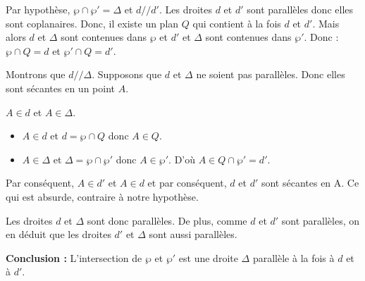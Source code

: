 \documentclass{cornouaille}
\begin{document}
\begin{preuve}
  Par hypothèse, $\wp\cap\wp'=\Delta$ et $d//d'$. Les droites $d$ et
  $d'$ sont parallèles donc elles sont coplanaires. Donc, il existe un
  plan $Q$ qui contient à la fois $d$ et $d'$. Mais alors $d$ et
  $\Delta$ sont contenues dans $\wp$ et $d'$ et $\Delta$ sont
  contenues dans $\wp'$. Donc : $\wp\cap Q=d$ et $\wp'\cap Q=d'$.

  Montrons que $d//\Delta$.
  Supposons que $d$ et $\Delta$ ne soient pas parallèles. Donc elles
  sont sécantes en un point $A$.

  $A\in d$ et $A\in\Delta$.
  \begin{itemize}
  \item $A\in d$ et $d=\wp\cap Q$ donc $A\in Q$.
  \item $A\in\Delta$ et $\Delta=\wp\cap\wp'$ donc $A\in\wp'$.  D'où
    $A\in Q\cap\wp'=d'$.
  \end{itemize}

  Par conséquent, $A\in d'$ et $A\in d$ et par conséquent, $d$ et $d'$
  sont sécantes en A.
  Ce qui est absurde, contraire à notre hypothèse.

  Les droites $d$ et $\Delta$ sont donc parallèles.  De plus, comme
  $d$ et $d'$ sont parallèles, on en déduit que les droites $d'$ et
  $\Delta$ sont aussi parallèles.  

  \textbf{Conclusion :} L'intersection de $\wp$ et $\wp'$ est une
  droite $\Delta$ parallèle à la fois à $d$ et à $d'$.
\end{preuve}
\end{document}
